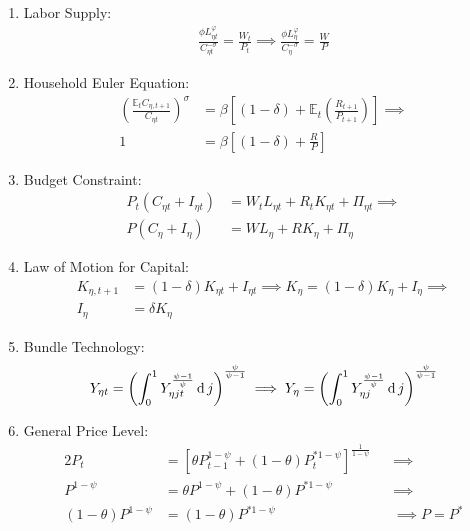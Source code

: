 \documentclass[
	thesis.tex
	]{subfiles}
\begin{document}
\begin{enumerate}
	\item Labor Supply:
	\begin{align}
		\frac{\phi L_{\eta t}^{\varphi}}{C_{\eta t}^{-\sigma}} = \frac{W_t}{P_t} \implies \frac{\phi L_{\eta}^{\varphi}}{C_{\eta}^{-\sigma}} = \frac{W}{P} \label{eq:reg-ss-household-labor-supply}
	\end{align}
	
	\item Household Euler Equation: 
	\begin{align}
		\left( \frac{\mathbb{E}_t C_{\eta, t+1}}{C_{\eta t}} \right)^\sigma &= \beta \left[ (1-\delta) + \mathbb{E}_t \left(\frac{R_{t+1}}{P_{t+1}}\right) \right] \implies \nonumber \\
		1 &= \beta \left[ (1-\delta) + \frac{R}{P} \right] \label{eq:reg-ss-household-euler-equation}
	\end{align}
	
	\item Budget Constraint: 
	\begin{align}
		P_t (C_{\eta t} + I_{\eta t}) &= W_t L_{\eta t} + R_t K_{\eta t} + \Pi_{\eta t} \implies \nonumber \\
		P (C_{\eta} + I_{\eta}) &= W L_{\eta} + R K_{\eta} + \Pi_{\eta} \label{eq:reg-ss-household-budget-constraint}
	\end{align}
	
	\item Law of Motion for Capital:
	\begin{align}
		K_{\eta, t+1} &= (1-\delta)K_{\eta t} + I_{\eta t} \implies K_{\eta} = (1-\delta)K_{\eta} + I_{\eta} \implies \nonumber \\
		I_{\eta} &= \delta K_{\eta} \label{eq:reg-ss-law-of-motion-for-capital}
	\end{align}
	
	\item Bundle Technology:
	\begin{align}
		Y_{\eta t} = \left( \int_{0}^{1} Y_{\eta jt}^{\frac{\psi-1}{\psi}} \dif j \right)^{\frac{\psi}{\psi-1}} \implies %
		Y_{\eta} = \left( \int_{0}^{1} Y_{\eta j}^{\frac{\psi-1}{\psi}} \dif j \right)^{\frac{\psi}{\psi-1}} \label{eq:reg-ss-final-good-firm-bundle-rule}
	\end{align}
	
	\item General Price Level:
	\begin{alignat}{2}
		\label{eq:reg-ss-general-price-level}
		P_t &= \left[ \theta P_{t-1}^{1-\psi} + (1-\theta) P_t^{\ast 1-\psi} \right]^\frac{1}{1-\psi} &&\implies \nonumber \\
		P^{1-\psi} &= \theta P^{1-\psi} + (1-\theta) P^{\ast 1-\psi} &&\implies \nonumber \\ 
		(1-\theta) P^{1-\psi} &= (1-\theta) P^{\ast 1-\psi} &&\implies P = P^\ast
	\end{alignat}
	

\end{enumerate}
\end{document}
